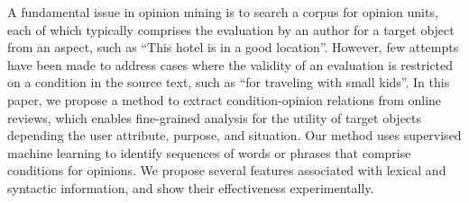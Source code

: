 A fundamental issue in opinion mining is to search a corpus for opinion units, each of which typically comprises the evaluation by an author for a target object from an aspect, such as ``This hotel is in a good location''. However, few attempts have been made to address cases where the validity of an evaluation is restricted on a condition in the source text, such as ``for traveling with small kids''. In this paper, we propose a method to extract condition-opinion relations from online reviews, which enables fine-grained analysis for the utility of target objects depending the user attribute, purpose, and situation. Our method uses supervised machine learning to identify sequences of words or phrases that comprise conditions for opinions. We propose several features associated with lexical and syntactic information, and show their effectiveness experimentally.
